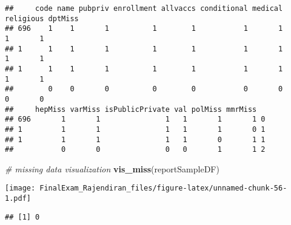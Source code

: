 \documentclass[]{article}
\newenvironment{Shaded}{\begin{snugshade}}{\end{snugshade}}
\newcommand{\CommentTok}[1]{\textcolor[rgb]{0.56,0.35,0.01}{\textit{#1}}}
\newcommand{\KeywordTok}[1]{\textcolor[rgb]{0.13,0.29,0.53}{\textbf{#1}}}
\newcommand{\NormalTok}[1]{#1}
\newcommand{\OperatorTok}[1]{\textcolor[rgb]{0.81,0.36,0.00}{\textbf{#1}}}
\newcommand{\StringTok}[1]{\textcolor[rgb]{0.31,0.60,0.02}{#1}}
\begin{document}
\begin{verbatim}
##     code name pubpriv enrollment allvaccs conditional medical religious dptMiss
## 696    1    1       1          1        1           1       1         1       1
## 1      1    1       1          1        1           1       1         1       1
## 1      1    1       1          1        1           1       1         1       1
##        0    0       0          0        0           0       0         0       0
##     hepMiss varMiss isPublicPrivate val polMiss mmrMiss  
## 696       1       1               1   1       1       1 0
## 1         1       1               1   1       1       0 1
## 1         1       1               1   1       0       1 1
##           0       0               0   0       1       1 2
\end{verbatim}

\begin{Shaded}
\begin{Highlighting}[]
\CommentTok{# missing data visualization}
\KeywordTok{vis_miss}\NormalTok{(reportSampleDF)}
\end{Highlighting}
\end{Shaded}

\texttt{[image: FinalExam\_Rajendiran\_files/figure-latex/unnamed-chunk-56-1.pdf]}

\begin{Shaded}
\end{Shaded}

\begin{verbatim}
## [1] 0
\end{verbatim}

\begin{Shaded}
\end{Shaded}
\end{document}
